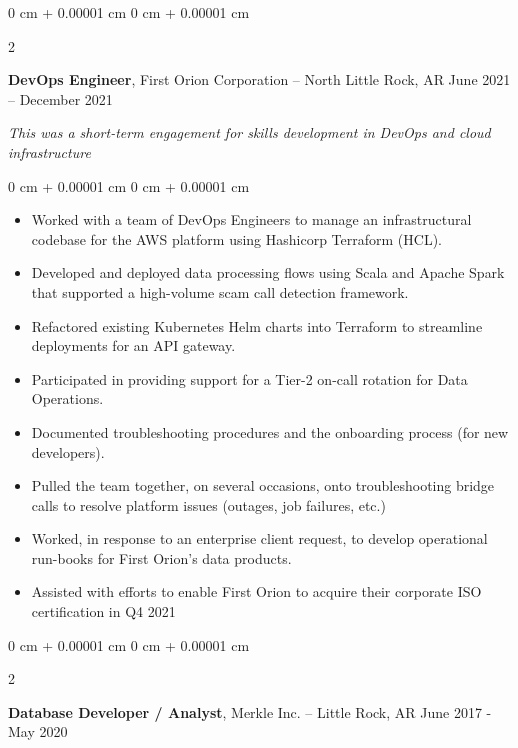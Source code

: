 \documentclass[10pt, letterpaper]{article}
\newenvironment{highlights}{
    \begin{itemize}[
        topsep=0.10 cm,
        parsep=0.10 cm,
        partopsep=0pt,
        itemsep=0pt,
        leftmargin=0 cm + 10pt
    ]
}{
    \end{itemize}
} %
\newenvironment{onecolentry}{
    \begin{adjustwidth}{
        0 cm + 0.00001 cm
    }{
        0 cm + 0.00001 cm
    }
}{
    \end{adjustwidth}
} %
\newenvironment{twocolentry}[2][]{
    \onecolentry
    \def\secondColumn{#2}
    \setcolumnwidth{\fill, 4.5 cm}
    \begin{paracol}{2}
}{
    \switchcolumn \raggedleft \secondColumn
    \end{paracol}
    \endonecolentry
} %
\begin{document}
        \vspace{0.75 cm}

        \begin{twocolentry}{
            June 2021 – December 2021
        }
        \textbf{DevOps Engineer}, First Orion Corporation -- North Little Rock, AR \end{twocolentry}

        \vspace{0.15 cm}
        \textit{This was a short-term engagement for skills development in DevOps and cloud infrastructure}
        \vspace{0.25 cm}
        \begin{onecolentry}
            \begin{highlights}
            \item Worked with a team of DevOps Engineers to manage an infrastructural codebase for the AWS platform using Hashicorp Terraform (HCL).
            \item Developed and deployed data processing flows using Scala and Apache Spark that supported a high-volume scam call detection framework.
            \item Refactored existing Kubernetes Helm charts into Terraform to streamline deployments for an API gateway.
            \item Participated in providing support for a Tier-2 on-call rotation for Data Operations.
            \item Documented troubleshooting procedures and the onboarding process (for new developers).
            \item Pulled the team together, on several occasions, onto troubleshooting bridge calls to resolve platform issues (outages, job failures, etc.)
            \item Worked, in response to an enterprise client request, to develop operational run-books for First Orion’s data products.
            \item Assisted with efforts to enable First Orion to acquire their corporate ISO certification in Q4 2021
            \end{highlights}
        \end{onecolentry}

        \vspace{0.75 cm}
        \begin{twocolentry}{
            June 2017 - May 2020
        }
            \textbf{Database Developer / Analyst}, Merkle Inc. -- Little Rock, AR\end{twocolentry}
\end{document}

